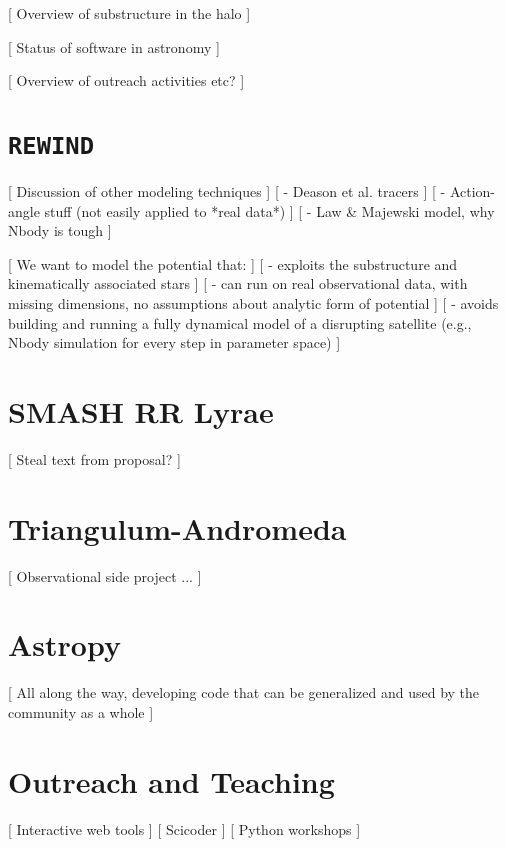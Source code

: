 \documentclass[letterpaper,12pt,preprint]{aastex}
\begin{document}
[ Overview of substructure in the halo ]

[ Status of software in astronomy ]

[ Overview of outreach activities etc? ]

\section{\texttt{REWIND}}

[ Discussion of other modeling techniques ]
[ - Deason et al. tracers ]
[ - Action-angle stuff (not easily applied to *real data*) ]
[ - Law \& Majewski model, why Nbody is tough ]

[ We want to model the potential that: ]
[ - exploits the substructure and kinematically associated stars ]
[ - can run on real observational data, with missing dimensions, no assumptions about analytic form of potential ]
[ - avoids building and running a fully dynamical model of a disrupting satellite (e.g., Nbody simulation for every step in parameter space) ]

\section{SMASH RR Lyrae}

[ Steal text from proposal? ]

\section{Triangulum-Andromeda}

[ Observational side project ... ]

\section{Astropy}

[ All along the way, developing code that can be generalized and used by the community as a whole ]

\section{Outreach and Teaching}

[ Interactive web tools ]
[ Scicoder ]
[ Python workshops ]
\end{document}
